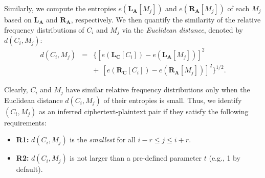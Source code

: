 Similarly, we compute the entropies $e(\mathbf{L_A}[M_j])$ and
$e(\mathbf{R_A}[M_j])$ of each $M_j$ based on $\mathbf{L_A}$ and
$\mathbf{R_A}$, respectively.  We then quantify the similarity of the relative
frequency distributions of $C_i$ and $M_j$ via the {\em Euclidean distance},
denoted by $d(C_i, M_j)$:  
\begin{eqnarray*}
	d(C_i, M_j) & = & 
	\big\{[e(\mathbf{L_C}[C_i]) - e(\mathbf{L_A}[M_j])]^2 \\
	& & + \ \ [e(\mathbf{R_C}[C_i]) - e(\mathbf{R_A}[M_j])]^2\big\}^{1/2}.
\end{eqnarray*}

Clearly, $C_i$ and $M_j$ have similar relative frequency distributions only
when the Euclidean distance $d(C_i, M_j)$ of their entropies is small.
Thus,  we identify $(C_i, M_j)$ as an inferred ciphertext-plaintext pair if
they satisfy the following requirements: 
%
\begin{itemize}[leftmargin=*]
\item {\bf R1:} $d(C_i, M_j)$ is the {\em smallest} for all $i-r \leq j \leq i+r$.
\item {\bf R2:} $d(C_i, M_j)$ is not larger than a pre-defined parameter $t$ (e.g., 1 by default).
\end{itemize}


